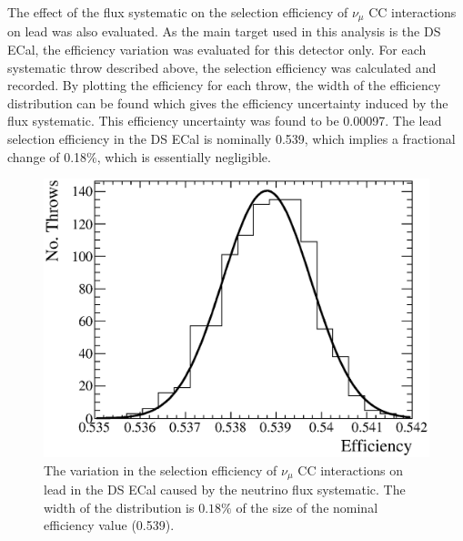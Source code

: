\newline
\newline
The effect of the flux systematic on the selection efficiency of $\nu_\mu$ CC interactions on lead was also evaluated.  As the main target used in this analysis is the DS ECal, the efficiency variation was evaluated for this detector only.  For each systematic throw described above, the selection efficiency was calculated and recorded.  By plotting the efficiency for each throw, the width of the efficiency distribution can be found which gives the efficiency uncertainty induced by the flux systematic.  This efficiency uncertainty was found to be 0.00097.  The lead selection efficiency in the DS ECal is nominally 0.539, which implies a fractional change of 0.18$\%$, which is essentially negligible.
\begin{figure}
  \centering
  \includegraphics[width=12cm]{images/measurement/systematics/flux/flux_efficiency_variation.eps}
  \caption{The variation in the selection efficiency of $\nu_\mu$ CC interactions on lead in the DS ECal caused by the neutrino flux systematic.  The width of the distribution is $0.18\%$ of the size of the nominal efficiency value (0.539).}
  \label{fig:FluxEfficiencyVariation}
\end{figure}
